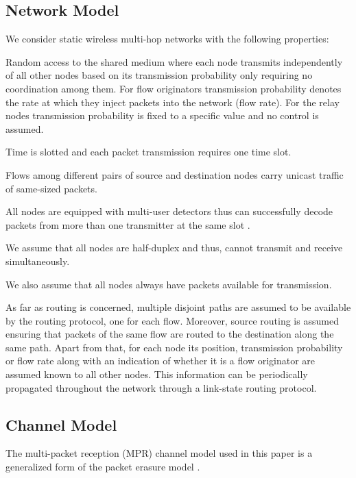 \documentclass[conference]{IEEEtran}
\begin{document}
\subsection{Network Model}

We consider static wireless multi-hop networks with the following properties:
\begin{IEEEitemize}
    \item Random access to the shared medium where each node transmits independently of all other nodes based on its transmission probability only
    requiring no coordination among them.
    For flow originators transmission probability denotes the rate at which they inject packets into the network (flow rate).
    For the relay nodes transmission probability is fixed to a specific value and no control is assumed.
    \item Time is slotted and each packet transmission requires one time slot.
    \item Flows among different pairs of source and destination nodes carry unicast traffic of same-sized packets.
    \item All nodes are equipped with multi-user detectors thus can successfully decode packets
    from more than one transmitter at the same slot \cite{Verdu:1998:MD:521411}.
    \item We assume that all nodes are half-duplex and thus, cannot transmit and receive simultaneously.
    \item We also assume that all nodes always have packets available for transmission.
    \item As far as routing is concerned, multiple disjoint paths are assumed to be available by the routing protocol, one for each flow.
    Moreover, source routing is assumed ensuring that packets of the same flow are routed to the destination along the same path.
    Apart from that, for each node its position, transmission probability or flow rate along with an indication of whether it is a flow originator are assumed
    known to all other nodes. This information can be periodically propagated throughout the network through a link-state routing protocol.
\end{IEEEitemize}

\subsection{Channel Model}
\label{sec:chan_model}

The multi-packet reception (MPR) channel model used in this paper is a generalized form of the packet erasure model \cite{Pappas:2014:SPI:2611842.2612059}.
\end{document}
